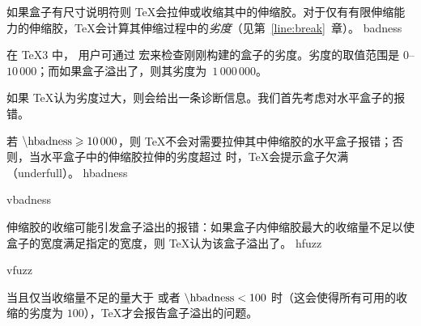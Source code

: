 \documentclass{book}
\begin{document}
如果盒子有尺寸说明符则 \TeX 会拉伸或收缩其中的伸缩胶。对于仅有有限伸缩能力的伸缩胶，\TeX 会计算其伸缩过程中的\emph{劣度}（见第~\ref{line:break}~章）。%
\cstoidx badness\par
在 \TeX3 中，%
用户可通过  宏来检查刚刚构建的盒子的劣度。劣度的取值范围是 $0$--$10\,000$；而如果盒子溢出了，则其劣度为~$1\,000\,000$。

如果 \TeX 认为劣度过大，则会给出一条诊断信息。我们首先考虑对水平盒子的报错。

若 $\text{\textbackslash hbadness}\geqslant10\,000$，则 \TeX 不会对需要拉伸其中伸缩胶的水平盒子报错；否则，当水平盒子中的伸缩胶拉伸的劣度超过  时，\TeX 会提示盒子欠满（underfull）。
\cstoidx hbadness\par
\cstoidx vbadness\par

伸缩胶的收缩可能引发盒子溢出的报错：如果盒子内伸缩胶最大的收缩量不足以使盒子的宽度满足指定的宽度，则 \TeX 认为该盒子溢出了。%
\cstoidx hfuzz\par
\cstoidx vfuzz\par
当且仅当收缩量不足的量大于  或者 $\text{\textbackslash hbadness}<100$ 时（这会使得所有可用的收缩的劣度为 $100$），\TeX 才会报告盒子溢出的问题。
\end{document}
